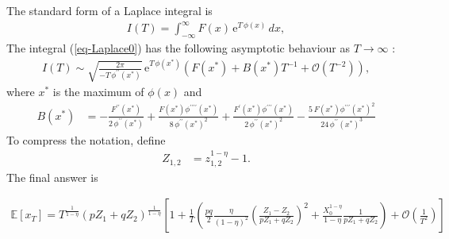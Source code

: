 \documentclass[11pt]{article}
\begin{document}
The standard form of a Laplace integral is
\begin{align}
\label{eq-Laplace0}
I(T) = \int_{-\infty}^{\infty} F(x)\,\mathrm{e}^{T\,\phi(x)}\, dx,
\end{align}
The integral (\ref{eq-Laplace0}) has the following asymptotic behaviour as $T \to \infty$ \cite{bender2013advanced}:
\begin{align}
I(T) \sim \sqrt{\frac{2\pi }{-T\,\phi^{\prime\prime}(x^*)}}\,\mathrm{e}^{T \,\phi(x^*)}\left(F(x^*)+B(x^*) T^{-1}+\mathcal{O}\left(T^{-2}\right)\right),
\end{align}
where $x^*$ is the maximum of $\phi(x)$ and
\begin{align}
B(x^*) &=  - \frac{F^{\prime\prime}(x^*)}{2\, \phi^{\prime\prime}(x^*)} 
                 + \frac{F(x^*) \phi^{\prime\prime\prime\prime}(x^*)}{8\,\phi^{\prime\prime}(x^*)^2}
                 + \frac{F^\prime(x^*) \phi^{\prime\prime\prime}(x^*)}{2\,\phi^{\prime\prime}(x^*)^2}
                 - \frac{5\,F(x^*) \phi^{\prime\prime\prime}(x^*)^2}{24\,\phi^{\prime\prime}(x^*)^3}
\end{align}
To compress the notation, define
\begin{align*}
Z_{1,2} &= z_{1,2}^{1-\eta}-1.
\end{align*}
The final answer is

\begin{align*}
\mathbb{E}\left[x_T\right] = T^\frac{1}{1-\eta} \left( p Z_1 + q Z_2\right)^\frac{1}{1-\eta} \left[ 1+  
\frac{1}{T}\left( \frac{p q}{2}\frac{\eta}{(1-\eta)^2}\left(\frac{Z_1-Z_2}{pZ_1+q Z_2}\right)^2 + \frac{X_0^{1-\eta}}{1-\eta} \frac{1}{p Z_1+q Z_2}\right)
+ \mathcal{O}\left(\frac{1}{T^2}\right) \right]
\end{align*}



\end{document}
